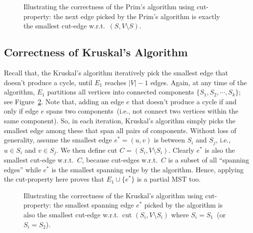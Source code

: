 \begin{figure}[h]
\centering{}
\caption{Illustrating the correctness of the Prim's algorithm using cut-property:
the next edge picked by the Prim's algorithm is exactly the smallest cut-edge w.r.t.\ $(S,V\setminus S)$.}
\label{fig:prim}
\end{figure}


\subsection*{Correctness of Kruskal's Algorithm}

Recall that, the Kruskal's algorithm iteratively pick the smallest edge that doesn't produce a cycle,
until $E_1$ reaches $|V| - 1$ edges. Again, at any time of the algorithm,
$E_1$ partitions all vertices into connected components $\{S_1, S_2, \cdots, S_k\}$; see Figure~\ref{fig:kruskal}.
Note that, adding an edge $e$ that doesn't produce a cycle if and only if edge $e$ spans two components~(i.e., not connect two vertices within the same component).
So, in each iteration, Kruskal's algorithm simply picks the smallest edge among these that span all pairs of
components. Without loss of generality, assume the smallest edge $e^* = (u,v)$ is between $S_i$ and $S_j$, i.e., $u\in S_i$ and $v\in S_j$.
We then define cut $C = (S_i, V\setminus S_i)$. Clearly $e^*$ is also the smallest cut-edge w.r.t.\ $C$,
because cut-edges w.r.t.\ $C$ is a subset of all ``spanning edges'' while $e^*$ is the smallest spanning edge by the algorithm.
Hence, applying the cut-property here proves that $E_1\cup \{e^*\}$ 
is a partial MST too.

\begin{figure}[h]
\centering{}
\caption{Illustrating the correctness of the Kruskal's algorithm using cut-property:
the smallest spanning edge $e^*$ picked by the algorithm is also the smallest cut-edge
	w.r.t.\ cut $(S_i,V\setminus S_i)$ where $S_i = S_1$~(or $S_i = S_2$).  }
\label{fig:kruskal}
\end{figure}

